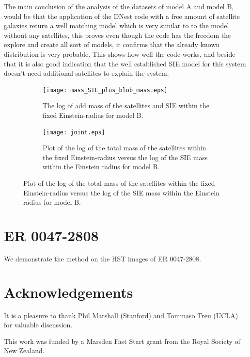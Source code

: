 \documentclass[useAMS,usenatbib]{mn2e}
\begin{document}
The main conclusion of the analysis of the datasets of model A and model B, would be that the application of the DNest code with a free amount of satellite galaxies return a well matching model which is very similar to to the model without any satellites, this proves 
even though the code has the freedom the explore and create all sort of models, it confirms that the already known distribution is very probable. This shows how well the code works, and beside that it is also good indication that the well established SIE model for this system doesn't need additional satellites to explain the system. 
 
\begin{figure}
\hspace{10pt}
\begin{subfigure}{.5\textwidth}
\vspace{-12pt}
  \centering
  \texttt{[image: mass\_SIE\_plus\_blob\_mass.eps]}
\parbox{0.8\linewidth}{\caption{The log of add mass of the satellites and SIE within the fixed Einstein-radius for model B.   \label{fig:sub5}}}
\end{subfigure}
\begin{subfigure}{.5\textwidth}
  \centering
  \texttt{[image: joint.eps]}
\parbox{0.8\linewidth}{\caption{Plot of the log of the total mass of the satellites within the fixed Einstein-radius versus the 
log of the SIE mass within the Einstein radius for model B.  \label{fig:sub6} }}
\end{subfigure}

   \end{figure}

  
  

\section{ER 0047-2808}
We demonstrate the method on the HST images of ER 0047-2808.



\section*{Acknowledgements}
It is a pleasure to thank Phil Marshall (Stanford) and Tommaso Treu (UCLA)
for valuable discussion.

This work was funded by a Marsden Fast Start grant from the Royal Society of
New Zealand.
\end{document}
